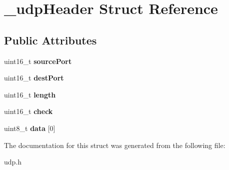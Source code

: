 \hypertarget{struct__udpHeader}{}\section{\+\_\+udp\+Header Struct Reference}
\label{struct__udpHeader}
\subsection*{Public Attributes}
\begin{DoxyCompactItemize}
\item 
\mbox{\label{struct__udpHeader_a318d6c6ebbb78b96e79451807b7187ec}} 
uint16\+\_\+t {\bfseries source\+Port}
\item 
\mbox{\label{struct__udpHeader_ad654bb71024cb9833c01f3a563ff5f65}} 
uint16\+\_\+t {\bfseries dest\+Port}
\item 
\mbox{\label{struct__udpHeader_a912e28858fbe7c6e92821bb7c0e8f93d}} 
uint16\+\_\+t {\bfseries length}
\item 
\mbox{\label{struct__udpHeader_a2f371a5a061e0167174a293c4ef427fd}} 
uint16\+\_\+t {\bfseries check}
\item 
\mbox{\label{struct__udpHeader_a1723bc19d441508c0cf4a9f506f37d68}} 
uint8\+\_\+t {\bfseries data} \mbox{[}0\mbox{]}
\end{DoxyCompactItemize}


The documentation for this struct was generated from the following file\+:\begin{DoxyCompactItemize}
\item 
udp.\+h\end{DoxyCompactItemize}
